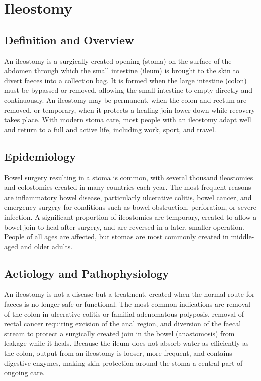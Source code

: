 \chapter{Ileostomy}

\section*{Definition and Overview}
An ileostomy is a surgically created opening (stoma) on the surface of the abdomen through which the small intestine (ileum) is brought to the skin to divert faeces into a collection bag. It is formed when the large intestine (colon) must be bypassed or removed, allowing the small intestine to empty directly and continuously. An ileostomy may be permanent, when the colon and rectum are removed, or temporary, when it protects a healing join lower down while recovery takes place. With modern stoma care, most people with an ileostomy adapt well and return to a full and active life, including work, sport, and travel.

\section*{Epidemiology}
Bowel surgery resulting in a stoma is common, with several thousand ileostomies and colostomies created in many countries each year. The most frequent reasons are inflammatory bowel disease, particularly ulcerative colitis, bowel cancer, and emergency surgery for conditions such as bowel obstruction, perforation, or severe infection. A significant proportion of ileostomies are temporary, created to allow a bowel join to heal after surgery, and are reversed in a later, smaller operation. People of all ages are affected, but stomas are most commonly created in middle-aged and older adults.

\section*{Aetiology and Pathophysiology}
An ileostomy is not a disease but a treatment, created when the normal route for faeces is no longer safe or functional. The most common indications are removal of the colon in ulcerative colitis or familial adenomatous polyposis, removal of rectal cancer requiring excision of the anal region, and diversion of the faecal stream to protect a surgically created join in the bowel (anastomosis) from leakage while it heals. Because the ileum does not absorb water as efficiently as the colon, output from an ileostomy is looser, more frequent, and contains digestive enzymes, making skin protection around the stoma a central part of ongoing care.

